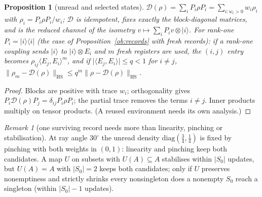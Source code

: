 \documentclass[aps,pra,onecolumn,superscriptaddress,nofootinbib,10pt]{revtex4-2}
\newtheorem{proposition}[theorem]{Proposition}
\theoremstyle{definition}
\theoremstyle{remark}
\newtheorem{remark}[theorem]{Remark}
\newcommand{\ip}[2]{\langle #1,#2\rangle}
\begin{document}
\begin{proposition}[unread and selected states]\label{prop:sopinching}
$\mathcal D(\rho)=\sum_iP_i\rho P_i=\sum_{i:w_i>0}w_i\rho_i$ with $\rho_i=P_i\rho P_i/w_i$; $\mathcal D$ is idempotent, fixes exactly the block-diagonal
matrices, and is the reduced channel of the isometry $v\mapsto\sum_iP_iv\otimes\lvert i\rangle$.  For rank-one $P_i=\lvert i\rangle\langle i\rvert$
(the case of Proposition~\ref{ob:records} with fresh records): if a rank-one coupling sends $\lvert i\rangle$
to $\lvert i\rangle\otimes E_i$ and $m$ fresh registers are used, the $(i,j)$ entry becomes $\rho_{ij}\ip{E_j}{E_i}^m$, and if $\lvert\ip{E_j}{E_i}\rvert\le q<1$ for
$i\ne j$, $\lVert\rho_m-\mathcal D(\rho)\rVert_{\mathrm{HS}}\le q^m\lVert\rho-\mathcal D(\rho)\rVert_{\mathrm{HS}}$.
\end{proposition}
\begin{proof}
Blocks are positive with trace $w_i$; orthogonality gives $P_i\mathcal D(\rho)P_j=\delta_{ij}P_i\rho P_i$; the partial trace removes the terms
$i\ne j$.  Inner products multiply on tensor products.  (A reused environment needs its own analysis.)
\end{proof}

\begin{remark}[one surviving record needs more than linearity, pinching or stabilisation]\label{rem:sononselection}
At ray angle $30^\circ$ the unread density $\mathrm{diag}(\tfrac34,\tfrac14)$ is fixed by pinching with both weights in $(0,1)$: linearity
and pinching keep both candidates.  A map $U$ on subsets with $U(A)\subseteq A$ stabilises within $\lvert S_0\rvert$ updates, but
$U(A)=A$ with $\lvert S_0\rvert=2$ keeps both candidates; only if $U$ preserves nonemptiness and strictly shrinks every
nonsingleton does a nonempty $S_0$ reach a singleton (within $\lvert S_0\rvert-1$ updates).
\end{remark}
\end{document}
